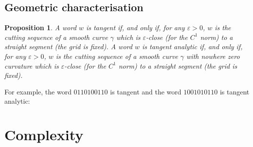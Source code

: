 \documentclass[preliminary]{eptcs}
\newtheorem{proposition}[Theorem]{Proposition}
\begin{document}
\subsection{Geometric characterisation}
\begin{proposition}
A word $w$ is tangent if, and only if, for any $\varepsilon > 0$, $w$ is
the cutting sequence of a smooth curve $\gamma$ which is
$\varepsilon$-close (for the $C^1$ norm) to a straight segment (the grid
is fixed).
\newline
A word $w$ is tangent analytic if, and only if, for any $\varepsilon > 0$,
$w$ is the cutting sequence of a smooth curve $\gamma$ with nowhere zero
curvature which is $\varepsilon$-close (for the $C^1$ norm) to a straight
segment (the grid is fixed).\\
\end{proposition}
For example, the word $0110100110$ is tangent and the word $1001010110$ is
tangent analytic:
\begin{center}
\end{center}





\section{Complexity}
\end{document}
